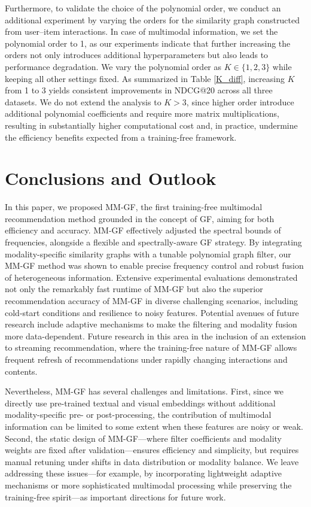 \documentclass[a4paper,fleqn]{cas-sc}
\begin{document}
Furthermore, to validate the choice of the polynomial order, we conduct an additional experiment by varying the orders for the similarity graph constructed from user--item interactions. In case of multimodal information, we set the polynomial order to 1, as our experiments indicate that further increasing the orders not only introduces additional hyperparameters but also leads to performance degradation. We vary the polynomial order as $K \in \{1,2,3\}$ while keeping all other settings fixed. As summarized in Table \ref{K_diff}, increasing $K$ from 1 to 3 yields consistent improvements in NDCG@20 across all three datasets. We do not extend the analysis to $K > 3$, since higher order introduce additional polynomial coefficients and require more matrix multiplications, resulting in substantially higher computational cost and, in practice, undermine the efficiency benefits expected from a training-free framework.

\section{Conclusions and Outlook}
\label{section 6}
In this paper, we proposed \textsf{MM-GF}, the first training-free multimodal recommendation method grounded in the concept of GF, aiming for both efficiency and accuracy. \textsf{MM-GF} effectively adjusted the spectral bounds of frequencies, alongside a flexible and spectrally-aware GF strategy. By integrating modality-specific similarity graphs with a tunable polynomial graph filter, our \textsf{MM-GF} method was shown to enable precise frequency control and robust fusion of heterogeneous information. Extensive experimental evaluations demonstrated not only the remarkably fast runtime of \textsf{MM-GF} but also the superior recommendation accuracy of \textsf{MM-GF} in diverse challenging scenarios, including cold-start conditions and resilience to noisy features. Potential avenues of future research include adaptive mechanisms to make the filtering and modality fusion more data-dependent. Future research in this area in the inclusion of an extension to streaming recommendation, where the training-free nature of \textsf{MM-GF} allows frequent refresh of recommendations under rapidly changing interactions and contents.

Nevertheless, \textsf{MM-GF} has several challenges and limitations. First, since we directly use pre-trained textual and visual embeddings without additional modality-specific pre- or post-processing, the contribution of multimodal information can be limited to some extent when these features are noisy or weak. Second, the static design of \textsf{MM-GF}—where filter coefficients and modality weights are fixed after validation—ensures efficiency and simplicity, but requires manual retuning under shifts in data distribution or modality balance. We leave addressing these issues---for example, by incorporating lightweight adaptive mechanisms or more sophisticated multimodal processing while preserving the training-free spirit---as important directions for future work.
\end{document}
